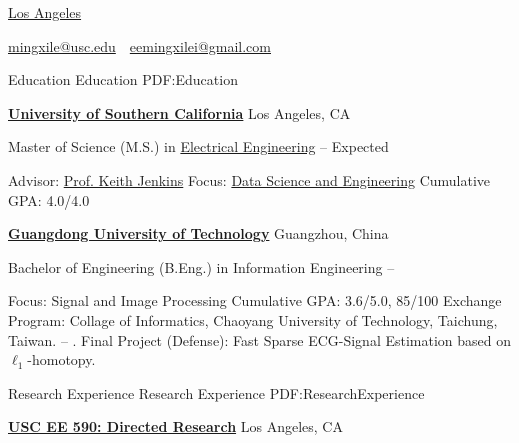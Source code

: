 \documentclass[letterpaper,MMMyyyy,nonstopmode]{simpleresumecv}
\newcommand{\CVAuthor}{Mingxi Lei}
\begin{document}

\Title{\CVAuthor}

\begin{SubTitle}
\href{https://www.google.com/maps/place/Los+Angeles+90007,+USA}
{Los Angeles}
\par
\href{mailto:mingxile@usc.edu}
{mingxile@usc.edu}
\,\SubBulletSymbol\,
\href{mailto:eemingxilei@gmail.com}
{eemingxilei@gmail.com}
\end{SubTitle}

\begin{Body}


\Section
{Education}
{Education}
{PDF:Education}

\Entry
\href{https://www.usc.edu/}
{\textbf{University of Southern California}}
\hfill
Los Angeles, CA

\Gap
\Item
Master of Science (M.S.) in
\href{https://minghsiehece.usc.edu/}
{Electrical Engineering}
\hfill
{} --
Expected 
\begin{Detail}
\SubBulletItem
Advisor:
\href{https://viterbi.usc.edu/directory/faculty/Jenkins/Brian}
{Prof. Keith Jenkins}
\SubBulletItem
Focus:
\href{https://minghsiehece.usc.edu/wp-content/uploads/2019/08/Data-Science.pdf}
{Data Science and Engineering}
\SubBulletItem
Cumulative GPA:
4.0/4.0
\end{Detail}

\BigGap
\Entry
\href{https://english.gdut.edu.cn/}
{\textbf{Guangdong University of Technology}}
\hfill
Guangzhou, China

\Gap
\Item
Bachelor of Engineering (B.Eng.) in
Information Engineering
\hfill
{} --
\begin{Detail}
\SubBulletItem
Focus:
Signal and Image Processing
\SubBulletItem
Cumulative GPA:
3.6/5.0,
85/100
\SubBulletItem
Exchange Program:
Collage of Informatics, Chaoyang University of Technology, Taichung, Taiwan.
 --
.
\SubBulletItem
Final Project (Defense):
Fast Sparse ECG-Signal Estimation based on
$\ell_1$-homotopy.
\end{Detail}



\Section
{Research Experience}
{Research Experience}
{PDF:ResearchExperience}

\Entry
\href{https://minghsiehece.usc.edu/wp-content/uploads/2019/05/Directed-Research-Guidlines.p}
{\textbf{USC EE 590: Directed Research}}
\hfill
Los Angeles, CA


\end{Body}
\end{document}

